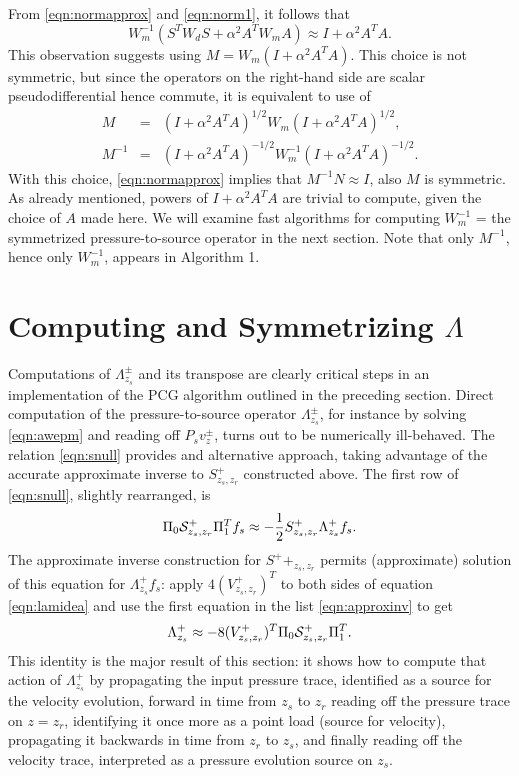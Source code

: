 \documentclass[georeport,12pt]{geophysics}
\begin{document}
From \ref{eqn:normapprox} and \ref{eqn:norm1}, it follows that
\[
  W_m^{-1}(S^TW_dS + \alpha^2 A^TW_mA) \approx I + \alpha^2 A^TA.
\]
This observation suggests using $M=W_m(I+\alpha^2A^TA)$. This choice
is not symmetric, but since the operators on the right-hand side are
scalar pseudodifferential hence commute, it is equivalent to use of
\begin{eqnarray}
  M         &=&(I+\alpha^2A^TA)^{1/2}W_m(I+\alpha^2A^TA)^{1/2},\nonumber \\
  M^{-1}
            &=&(I+\alpha^2A^TA)^{-1/2}W_m^{-1}(I+\alpha^2A^TA)^{-1/2}.
                \label{eqn:defprecond}
\end{eqnarray}
With this choice, \ref{eqn:normapprox} implies that
$M^{-1}N \approx I$, also $M$ is symmetric. As already mentioned,
powers of $I + \alpha^2A^TA$ are trivial to compute, given the choice
of $A$ made here. We will examine fast algorithms for computing
$W_m^{-1}$ = the symmetrized pressure-to-source operator in the next
section. Note that only $M^{-1}$, hence only $W_m^{-1}$, appears in
Algorithm 1.


\section{Computing and Symmetrizing $\Lambda$}

Computations of $\Lambda^{\pm}_{z_s}$ and its transpose are clearly critical steps in an
implementation of the PCG algorithm outlined in the preceding section.
Direct computation of the pressure-to-source operator $\Lambda^{\pm}_{z_s}$, for instance by solving
\ref{eqn:awepm} and reading off $P_sv^{\pm}_{z}$, turns out to be
numerically ill-behaved. The relation \ref{eqn:snull} provides and
alternative approach, taking advantage of the accurate approximate
inverse to $S^+_{z_s,z_r}$ constructed above. The first row of
\ref{eqn:snull}, slightly rearranged, is
\begin{equation}
  \label{eqn:lamidea}
  \Pi_0{\cal S}^+_{z_s,z_r}\Pi_1^T f_s \approx  -\frac{1}{2} S^+_{z_s,z_r}\Lambda^+_{z_s}f_s.
\end{equation}
The approximate inverse construction for $S^++_{z_s,z_r}$ permits (approximate)
solution of this equation for $\Lambda^+_{z_s}f_s$: apply
$4(V^{+}_{z_s,z_r})^T$ to both sides of equation \ref{eqn:lamidea} and
use the first equation in the list \ref{eqn:approxinv} to get
\begin{equation}
  \label{eqn:lamident}
  \Lambda^+_{z_s} \approx -8(V^{+}_{z_s,z_r})^T\Pi_0 {\cal S}^+_{z_s,z_r}\Pi_1^T.
\end{equation}
This identity is the major result of this section: it shows how
to compute that action of $\Lambda^+_{z_s}$ by propagating the input
pressure trace, identified as a source for the velocity evolution,
forward in time from $z_s$ to $z_r$
reading off the pressure trace on $z=z_r$, identifying it once more as
a point load (source for velocity), propagating it backwards in time from $z_r$ to
$z_s$, and finally reading off the velocity trace, interpreted as a
pressure evolution source on $z_s$. 
\end{document}
